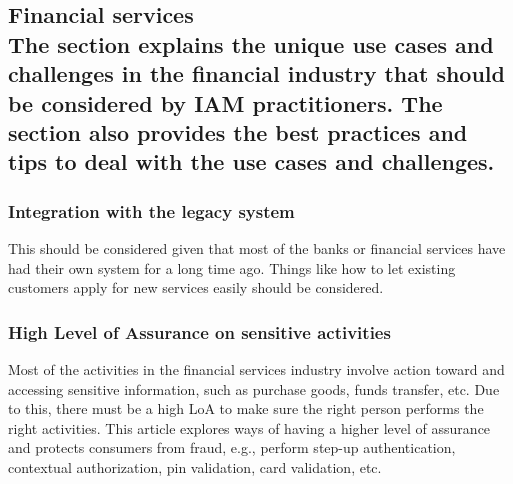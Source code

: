 \hypertarget{financial-services-the-section-explains-the-unique-use-cases-and-challenges-in-the-financial-industry-that-should-be-considered-by-iam-practitioners.-the-section-also-provides-the-best-practices-and-tips-to-deal-with-the-use-cases-and-challenges.}{%
\subsection{\texorpdfstring{Financial services\\
The section explains the unique use cases and challenges in the
financial industry that should be considered by IAM practitioners. The
section also provides the best practices and tips to deal with the use
cases and
challenges.}{Financial services The section explains the unique use cases and challenges in the financial industry that should be considered by IAM practitioners. The section also provides the best practices and tips to deal with the use cases and challenges.}}\label{financial-services-the-section-explains-the-unique-use-cases-and-challenges-in-the-financial-industry-that-should-be-considered-by-iam-practitioners.-the-section-also-provides-the-best-practices-and-tips-to-deal-with-the-use-cases-and-challenges.}}

\hypertarget{integration-with-the-legacy-system}{%
\subsubsection{Integration with the legacy
system}\label{integration-with-the-legacy-system}}

This should be considered given that most of the banks or financial
services have had their own system for a long time ago. Things like how
to let existing customers apply for new services easily should be
considered.

\hypertarget{high-level-of-assurance-on-sensitive-activities}{%
\subsubsection{High Level of Assurance on sensitive
activities}\label{high-level-of-assurance-on-sensitive-activities}}

Most of the activities in the financial services industry involve action
toward and accessing sensitive information, such as purchase goods,
funds transfer, etc. Due to this, there must be a high LoA to make sure
the right person performs the right activities. This article explores
ways of having a higher level of assurance and protects consumers from
fraud, e.g., perform step-up authentication, contextual authorization,
pin validation, card validation, etc.

